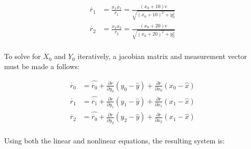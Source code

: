 \documentclass[12pt]{article}
\begin{document}
\begin{adjustwidth}{10mm}{0mm}
    \begin{equation}
      \begin{split}
        \dot{r_1} &= \frac{x_1\dot{x_1}}{r_1} = \frac{(x_0+10)v}
                                                {\sqrt{(x_0+10)^2 + y_0^2}} \\
        \dot{r_2} &= \frac{x_2\dot{x_2}}{r_2} = \frac{(x_0+20)v}
                                                {\sqrt{(x_0+20)^2 + y_0^2}} \\
      \end{split}
    \end{equation}

    To solve for $X_0$ and $Y_0$ iteratively, a jacobian matrix and 
    measurement vector must be made a follows:

    \begin{equation}
      \begin{split}
        \dot{r_0} &= \hat{\dot{r_0}} + \frac{\partial{\dot{r}}}{\partial{y_0}}
        (y_0 - \hat{y}) + \frac{\partial{\dot{r}}}{\partial{x_0}}(x_0 - \hat{x}) \\
        \dot{r_1} &= \hat{\dot{r_1}} + \frac{\partial{\dot{r}}}{\partial{y_1}}
        (y_1 - \hat{y}) + \frac{\partial{\dot{r}}}{\partial{x_1}}(x_1 - \hat{x}) \\
        \dot{r_2} &= \hat{\dot{r_0}} + \frac{\partial{\dot{r}}}{\partial{y_2}}
        (y_2 - \hat{y}) + \frac{\partial{\dot{r}}}{\partial{x_2}}(x_1 - \hat{x}) \\
      \end{split}
    \end{equation}

    Using both the linear and nonlinear equations, the resulting system is:


\end{adjustwidth}
\end{document}
